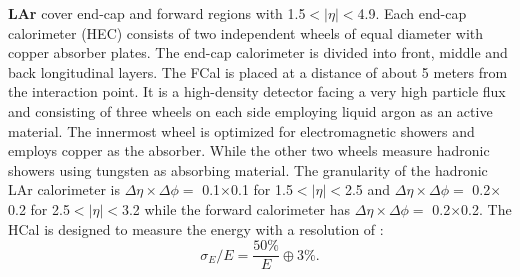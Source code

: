  \textbf{LAr} cover end-cap and forward regions with 1.5$<|\eta|<$4.9. Each end-cap calorimeter (HEC) consists of two independent wheels of equal diameter with copper absorber plates. The end-cap calorimeter is divided into front, middle and back longitudinal layers. The FCal is placed at a distance of about 5 meters from the interaction point. It is a high-density detector facing a very high particle flux and consisting of three wheels on each side employing liquid argon as an active material. The innermost wheel is optimized for electromagnetic showers and employs copper as the absorber. While the other two wheels measure hadronic showers using tungsten as absorbing material. The granularity of the hadronic LAr calorimeter is $\Delta\eta\times\Delta\phi=$ 0.1$\times$0.1 for 1.5$<|\eta|<$2.5 and $\Delta\eta\times\Delta\phi=$ 0.2$\times$0.2 for 2.5$<|\eta|<$3.2 while the forward calorimeter has $\Delta\eta\times\Delta\phi=$ 0.2$\times$0.2.
 The HCal is designed to measure the energy with a resolution of \cite{Tile_Perf}:
 \begin{equation}
     \sigma_E/E = \frac{50\%}{E} \oplus 3\%.
 \end{equation}

